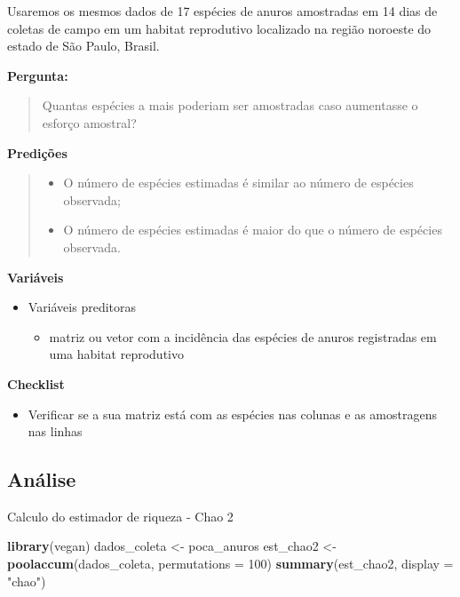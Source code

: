 \documentclass[
]{book}
\newenvironment{Shaded}{\begin{snugshade}}{\end{snugshade}}
\newcommand{\DataTypeTok}[1]{\textcolor[rgb]{0.13,0.29,0.53}{#1}}
\newcommand{\DecValTok}[1]{\textcolor[rgb]{0.00,0.00,0.81}{#1}}
\newcommand{\KeywordTok}[1]{\textcolor[rgb]{0.13,0.29,0.53}{\textbf{#1}}}
\newcommand{\NormalTok}[1]{#1}
\newcommand{\StringTok}[1]{\textcolor[rgb]{0.31,0.60,0.02}{#1}}
\providecommand{\tightlist}{%
  \setlength{\itemsep}{0pt}\setlength{\parskip}{0pt}}
\begin{document}
Usaremos os mesmos dados de 17 espécies de anuros amostradas em 14 dias de coletas de campo em um habitat reprodutivo localizado na região noroeste do estado de São Paulo, Brasil.

\textbf{Pergunta:}

\begin{quote}
Quantas espécies a mais poderiam ser amostradas caso aumentasse o esforço amostral?
\end{quote}

\textbf{Predições}

\begin{quote}
\begin{itemize}
\tightlist
\item
  O número de espécies estimadas é similar ao número de espécies observada;
\item
  O número de espécies estimadas é maior do que o número de espécies observada.
\end{itemize}
\end{quote}

\textbf{Variáveis}

\begin{itemize}
\tightlist
\item
  Variáveis preditoras

  \begin{itemize}
  \tightlist
  \item
    matriz ou vetor com a incidência das espécies de anuros registradas em uma habitat reprodutivo
  \end{itemize}
\end{itemize}

\textbf{Checklist}

\begin{itemize}
\tightlist
\item
  Verificar se a sua matriz está com as espécies nas colunas e as amostragens nas linhas
\end{itemize}

\hypertarget{anuxe1lise-4}{%
\subsection{Análise}\label{anuxe1lise-4}}

Calculo do estimador de riqueza - Chao 2

\begin{Shaded}
\begin{Highlighting}[]
\KeywordTok{library}\NormalTok{(vegan)}
\NormalTok{dados_coleta <-}\StringTok{ }\NormalTok{poca_anuros}
\NormalTok{est_chao2 <-}\StringTok{ }\KeywordTok{poolaccum}\NormalTok{(dados_coleta, }\DataTypeTok{permutations =} \DecValTok{100}\NormalTok{)}
\KeywordTok{summary}\NormalTok{(est_chao2, }\DataTypeTok{display =} \StringTok{"chao"}\NormalTok{)}
\end{Highlighting}
\end{Shaded}
\end{document}
